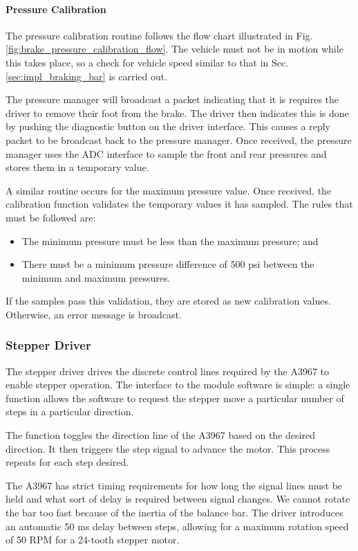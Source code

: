 \paragraph{Pressure Calibration}

The pressure calibration routine follows the flow chart illustrated in Fig. \ref{fig:brake_pressure_calibration_flow}. The vehicle must not be in motion while this takes place, so a check for vehicle speed similar to that in Sec. \ref{sec:impl_braking_bar} is carried out. 

The pressure manager will broadcast a packet indicating that it is requires the driver to remove their foot from the brake. The driver then indicates this is done by pushing the diagnostic button on the driver interface. This causes a reply packet to be broadcast back to the pressure manager. Once received, the pressure manager uses the ADC interface to sample the front and rear pressures and stores them in a temporary value.

A similar routine occurs for the maximum pressure value. Once received, the calibration function validates the temporary values it has sampled. The rules that must be followed are:

\begin{itemize}
\item The minimum pressure must be less than the maximum pressure; and
\item There must be a minimum pressure difference of 500 psi between the minimum and maximum pressures.
\end{itemize}

If the samples pass this validation, they are stored as new calibration values. Otherwise, an error message is broadcast.

\subsubsection{Stepper Driver}

The stepper driver drives the discrete control lines required by the A3967 to enable stepper operation. The interface to the module software is simple: a single function allows the software to request the stepper move a particular number of steps in a particular direction.

The function toggles the direction line of the A3967 based on the desired direction. It then triggers the step signal to advance the motor. This process repeats for each step desired. 

The A3967 has strict timing requirements for how long the signal lines must be held and what sort of delay is required between signal changes. We cannot rotate the bar too fast because of the inertia of the balance bar. The driver introduces an automatic 50 ms delay between steps, allowing for a maximum rotation speed of 50 RPM for a 24-tooth stepper motor.
